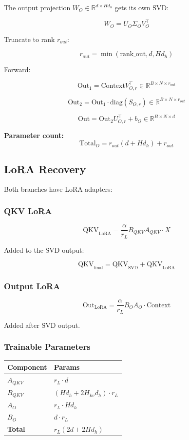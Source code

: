 The output projection $W_O \in \mathbb{R}^{d \times H d_h}$ gets its own SVD:

\[
W_O = U_O \Sigma_O V_O^\top
\]

Truncate to rank $r_{out}$:

\[
r_{out} = \min(\text{rank\_out}, d, H d_h)
\]

Forward:

\[
\text{Out}_1 = \text{Context} V_{O, r}^\top \in \mathbb{R}^{B \times N \times r_{out}}
\]

\[
\text{Out}_2 = \text{Out}_1 \cdot \text{diag}(S_{O, r}) \in \mathbb{R}^{B \times N \times r_{out}}
\]

\[
\text{Out} = \text{Out}_2 U_{O, r}^\top + b_O \in \mathbb{R}^{B \times N \times d}
\]

\textbf{Parameter count:}
\[
\text{Total}_O = r_{out} (d + H d_h) + r_{out}
\]

\subsection{LoRA Recovery}

Both branches have LoRA adapters:

\subsubsection{QKV LoRA}

\[
\text{QKV}_\text{LoRA} = \frac{\alpha}{r_L} B_{QKV} A_{QKV} \cdot X
\]

Added to the SVD output:

\[
\text{QKV}_\text{final} = \text{QKV}_\text{SVD} + \text{QKV}_\text{LoRA}
\]

\subsubsection{Output LoRA}

\[
\text{Out}_\text{LoRA} = \frac{\alpha}{r_L} B_O A_O \cdot \text{Context}
\]

Added after SVD output.

\subsubsection{Trainable Parameters}

\begin{table}[H]
\centering
\small
\begin{tabular}{ll}
\toprule
\textbf{Component} & \textbf{Params} \\
\midrule
$A_{QKV}$ & $r_L \cdot d$ \\
$B_{QKV}$ & $(H d_h + 2 H_{kv} d_h) \cdot r_L$ \\
$A_O$ & $r_L \cdot H d_h$ \\
$B_O$ & $d \cdot r_L$ \\
\textbf{Total} & $r_L (2d + 2 H d_h)$ \\
\bottomrule
\end{tabular}
\end{table}

